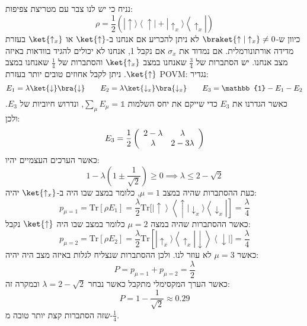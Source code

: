 \documentclass{tstextbook}
\begin{document}
\begin{example}
נניח כי יש לנו צבר עם מטריצת צפיפות:
$$\rho=\frac{1}{2}\left(|\!\uparrow\rangle\left\langle\uparrow\right|+|\!\uparrow_{x}\rangle\left\langle\uparrow_{x}\right|\right)$$
כיוון ש-\(\braket{ \uparrow | \uparrow_{x} }\neq 0\)  לא ניתן להכריע אם אנחנו ב-\(\ket{\uparrow}\) או \(\ket{\uparrow_{x}}\) בעזרת מדידה אורתונורמלית. אם נמדוד את \(\sigma_{x}\) אם נקבל 1, אנחנו לא יכולים להגיד בוודאות באיזה מצב אנחנו. יש הסתברות של \(\frac{3}{4}\) שאנחנו במצב \(\ket{\uparrow_{x}}\) והסתברות של \(\frac{1}{4}\) שאנחנו במצב \(\ket{\uparrow}\). ניתן לקבל אחוזים טובים יותר בעזרת POVM:
נגדיר:
$$E_{1}=\lambda \ket{\downarrow } \bra{\downarrow } \qquad  E_{2}=\lambda \ket{\downarrow _{x}} \bra{\downarrow _{x}} \qquad E_{3}= \mathbb{1} -E_{1}-E_{2}$$
כאשר הגדרנו את \(E_{3}\) כדי שייקם את יחס השלמות \(\sum_{\mu}E_{\mu}=\mathbb{1}\), ונדרוש חיוביות של \(E_{3}\). ולכן:
$$E_{3}=\frac{1}{2}\left(\begin{array}{c c}{{2-\lambda}}&{{\lambda}}\\ {{\lambda}}&{{2-3\lambda}}\end{array}\right)$$
כאשר הערכים העצמיים יהיו:
$$1-\lambda\left(1\pm\frac{1}{\sqrt{2}}\right)\geq 0\implies \lambda \leq 2 - \sqrt{ 2 }$$
כעת ההסתברות שהיה במצב \(\mu=1\), כלומר במצב שבו היה ב-\(\ket{\uparrow_{x}}\) יהיה:
$$p_{\mu=1}=\mathrm{Tr}\left[\rho E_{1}\right]=\frac{\lambda}{2}\mathrm{Tr}[\left|\uparrow\right\rangle\left\langle\uparrow|\downarrow_{x}\rangle\left\langle\downarrow_{x}\right|\right]=\frac{\lambda}{4}$$
כאשר ההסתברות שהיה במצה \(\mu=2\) כלומר במצב שבו היה \(\ket{\uparrow}\) נקבל:
$$p_{\mu=2}=\mathrm{Tr}\left[\rho E_{2}\right]=\frac{\lambda}{2}\mathrm{Tr}\left[\left|\uparrow_{x}\rangle\left\langle\uparrow_{x}\right.\right|\downarrow\right\rangle\left\langle\downarrow\right|]=\frac{\lambda}{4}$$
כאשר \(\mu=3\) לא עוזר לנו. ולכן ההסתברות שנצליח לגלות באיזה מצב היה יהיה:
$$P=p_{\mu=1}+p_{\mu=2}=\frac{\lambda}{2}$$
כאשר הערך המקסימלי מתקבל כאשר נבחר \(\lambda = 2-\sqrt{ 2 }\) ובמקרה זה:
$$P=1-\frac{1}{\sqrt{ 2 }}\approx 0.29$$
שזה הסתברות קצת יותר טובה מ-\(\frac{1}{4}\).

\end{example}
\end{document}
